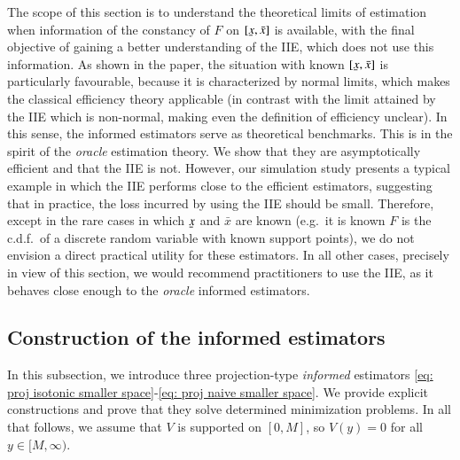 The scope of this section is to understand the theoretical limits of estimation when information of the constancy of $F$ on $[\ubar{x},\bar{x}]$ is available, with the final objective of gaining a better understanding of the IIE, which does not use this information. As shown in the paper, the situation with known $[\ubar{x},\bar{x}]$ is particularly favourable, because it is characterized by normal limits, which makes the classical efficiency theory applicable (in contrast with the limit attained by the IIE which is non-normal, making even the definition of efficiency unclear). In this sense, the informed estimators serve as theoretical benchmarks. This is in the spirit of the \textit{oracle} estimation theory. We show that they are asymptotically efficient and that the IIE is not. However, our simulation study presents a typical example in which the IIE performs close to the efficient estimators, suggesting that in practice, the loss incurred by using the IIE should be small. Therefore, except in the rare cases in which $\ubar{x}$ and $\bar{x}$ are known (e.g.\ it is known $F$ is the c.d.f.\ of a discrete random variable with known support points), we do not envision a direct practical utility for these estimators. In all other cases, precisely in view of this section, we would recommend practitioners to use the IIE, as it behaves close enough to the \textit{oracle} informed estimators.


\subsection{Construction of the informed estimators}\label{sec: construction estimators}

In this subsection, we introduce three projection-type \textit{informed} estimators \eqref{eq: proj isotonic smaller space}-\eqref{eq: proj naive smaller space}. We provide explicit constructions and prove that they solve determined minimization problems. In all that follows, we assume that \( V \) is supported on \([0, M]\), so \( V(y) = 0 \) for all \( y \in [M, \infty) \).

